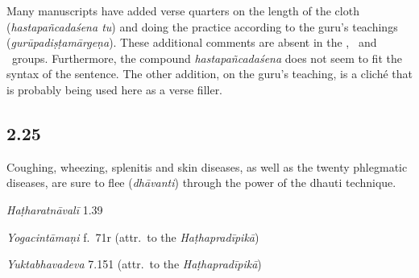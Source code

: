 \begin{ekdosis}
\begin{philcomm}[hp02_024]
Many manuscripts have added verse quarters on the length of the cloth (\emph{hastapañcadaśena tu}) and doing the practice according to the guru’s teachings (\emph{gurūpadiṣṭa\-mārgeṇa}). These additional comments are absent in the \textalpha, \textgamma\ and \textzeta\ groups. Furthermore, the compound \emph{hastapañcadaśena} does not seem to fit the syntax of the sentence. The other addition, on the guru's teaching, is a cliché that is probably being used here as a verse filler.
\end{philcomm}


\subsection*{2.25}
\begin{translation}[hp02_025]
Coughing, wheezing, splenitis and skin diseases, as well as the twenty phlegmatic diseases, are sure to flee (\textit{dhāvanti}) through the power of the dhauti technique.
\end{translation}


\begin{sources}[hp02_025]
\end{sources}

\begin{testimonia}[hp02_025]
\emph{Haṭharatnāvalī} 1.39

\begin{versinnote}
\end{versinnote}

\emph{Yogacintāmaṇi} f.~71r (attr.~to the \emph{Haṭhapradīpikā})

\begin{versinnote}
\end{versinnote}

\emph{Yuktabhavadeva} 7.151 (attr.~to the \emph{Haṭhapradīpikā})

\begin{versinnote}
\end{versinnote}


\end{testimonia}
\end{ekdosis}
